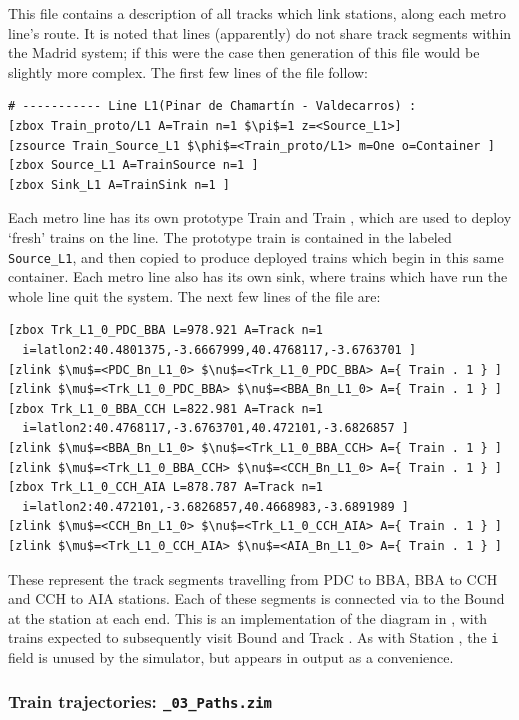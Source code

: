 This file contains a description of all tracks which link stations,
along each metro line's route. It is noted that lines (apparently) do not
share track segments within the Madrid system; if this were the case
then generation of this file would be slightly more complex.
The first few lines of the file follow:
\begin{lstlisting}[mathescape]
# ----------- Line L1(Pinar de Chamartín - Valdecarros) :
[zbox Train_proto/L1 A=Train n=1 $\pi$=1 z=<Source_L1>]
[zsource Train_Source_L1 $\phi$=<Train_proto/L1> m=One o=Container ]
[zbox Source_L1 A=TrainSource n=1 ]
[zbox Sink_L1 A=TrainSink n=1 ]
\end{lstlisting}
Each metro line has its own prototype Train  and Train , which are used to
deploy `fresh' trains on the line. The prototype train is contained in the  labeled {\tt Source\_L1},
and then copied to produce deployed trains which begin in this same container.
Each metro line also has its own sink, where trains which have run the whole line quit the system.
The next few lines of the file are:
\begin{lstlisting}[mathescape]
[zbox Trk_L1_0_PDC_BBA L=978.921 A=Track n=1
  i=latlon2:40.4801375,-3.6667999,40.4768117,-3.6763701 ]
[zlink $\mu$=<PDC_Bn_L1_0> $\nu$=<Trk_L1_0_PDC_BBA> A={ Train . 1 } ]
[zlink $\mu$=<Trk_L1_0_PDC_BBA> $\nu$=<BBA_Bn_L1_0> A={ Train . 1 } ]
[zbox Trk_L1_0_BBA_CCH L=822.981 A=Track n=1
  i=latlon2:40.4768117,-3.6763701,40.472101,-3.6826857 ]
[zlink $\mu$=<BBA_Bn_L1_0> $\nu$=<Trk_L1_0_BBA_CCH> A={ Train . 1 } ]
[zlink $\mu$=<Trk_L1_0_BBA_CCH> $\nu$=<CCH_Bn_L1_0> A={ Train . 1 } ]
[zbox Trk_L1_0_CCH_AIA L=878.787 A=Track n=1
  i=latlon2:40.472101,-3.6826857,40.4668983,-3.6891989 ]
[zlink $\mu$=<CCH_Bn_L1_0> $\nu$=<Trk_L1_0_CCH_AIA> A={ Train . 1 } ]
[zlink $\mu$=<Trk_L1_0_CCH_AIA> $\nu$=<AIA_Bn_L1_0> A={ Train . 1 } ]
\end{lstlisting}
These represent the track segments travelling from PDC to BBA,  BBA to CCH and CCH to AIA stations.
Each of these segments is connected via  to the Bound  at the station at each end.
This is an implementation of the diagram in , with trains expected to subsequently
visit Bound and Track .
As with Station , the {\tt i} field is unused by the simulator, but appears in output as
a convenience.

\subsubsection{Train trajectories: {\tt \_03\_Paths.zim}}

